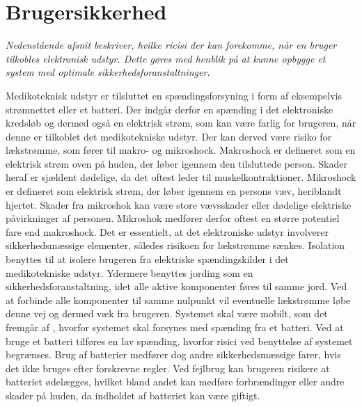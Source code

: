 \section{Brugersikkerhed}
\textit{Nedenstående afsnit beskriver, hvilke ricisi der kan forekomme, når en bruger tilkobles elektronisk udstyr. Dette gøres med henblik på at kunne opbygge et system med optimale sikkerhedsforanstaltninger.}

Medikoteknisk udstyr er tilsluttet en spændingsforsyning i form af eksempelvis strømnettet eller et batteri. Der indgår derfor en spænding i det elektroniske kredsløb og dermed også en elektrisk strøm, som kan være farlig for brugeren, når denne er tilkoblet det medikotekniske udstyr. Der kan derved være risiko for lækstrømme, som fører til makro- og mikroshock. Makroshock er defineret som en elektrisk strøm oven på huden, der løber igennem den tilsluttede person. Skader heraf er sjældent dødelige, da det oftest leder til muskelkontraktioner. Mikroshock er defineret som elektrisk strøm, der løber igennem en persons væv, heriblandt hjertet. Skader fra mikroshok kan være store vævsskader eller dødelige elektriske påvirkninger af personen. Mikroshok medfører derfor oftest en større potentiel fare end makroshock. \citep{Webster2011} \newline
Det er essentielt, at det elektroniske udstyr involverer sikkerhedsmæssige elementer, således risikoen for lækstrømme sænkes. Isolation benyttes til at isolere brugeren fra elektriske spændingskilder i det medikotekniske udstyr. Ydermere benyttes jording som en sikkerhedsforanstaltning, idet alle aktive komponenter føres til samme jord. Ved at forbinde alle komponenter til samme nulpunkt vil eventuelle lækstrømme løbe denne vej og dermed væk fra brugeren. \citep{Webster2011} \newline 
Systemet skal være mobilt, som det fremgår af , hvorfor systemet skal forsynes med spænding fra et batteri. Ved at bruge et batteri tilføres en lav spænding, hvorfor risici ved benyttelse af systemet begrænses. Brug af batterier medfører dog andre sikkerhedsmæssige farer, hvis det ikke bruges efter forskrevne regler. Ved fejlbrug kan brugeren risikere at batteriet ødelægges, hvilket bland andet kan medføre forbrændinger eller andre skader på huden, da indholdet af batteriet kan være giftigt. 
%
%
